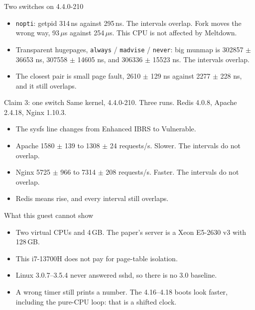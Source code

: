 \documentclass[aspectratio=169]{beamer}
\begin{document}
\begin{frame}{Two switches on 4.4.0-210}
\begin{itemize}
\item \texttt{nopti}: getpid 314\,ns against 295\,ns. The intervals overlap. Fork moves the wrong way, 93\,$\mu$s against 254\,$\mu$s. This CPU is not affected by Meltdown.
\item Transparent hugepages, \texttt{always} / \texttt{madvise} / \texttt{never}: big munmap is 302857 $\pm$ 36653 ns, 307558 $\pm$ 14605 ns, and 306336 $\pm$ 15523 ns. The intervals overlap.
\item The closest pair is small page fault, 2610 $\pm$ 129 ns against 2277 $\pm$ 228 ns, and it still overlaps.
\end{itemize}
\end{frame}

\begin{frame}{Claim 3: one switch}
Same kernel, 4.4.0-210. Three runs. Redis 4.0.8, Apache 2.4.18, Nginx 1.10.3.
\begin{itemize}
\item The sysfs line changes from Enhanced IBRS to Vulnerable.
\item Apache 1580 $\pm$ 139 to 1308 $\pm$ 24 requests/s. Slower. The intervals do not overlap.
\item Nginx 5725 $\pm$ 966 to 7314 $\pm$ 208 requests/s. Faster. The intervals do not overlap.
\item Redis means rise, and every interval still overlaps.
\end{itemize}
\end{frame}

\begin{frame}{What this guest cannot show}
\begin{itemize}
\item Two virtual CPUs and 4\,GB. The paper's server is a Xeon E5-2630 v3 with 128\,GB.
\item This i7-13700H does not pay for page-table isolation.
\item Linux 3.0.7--3.5.4 never answered sshd, so there is no 3.0 baseline.
\item A wrong timer still prints a number. The 4.16--4.18 boots look faster, including the pure-CPU loop: that is a shifted clock.
\end{itemize}
\end{frame}
\end{document}
